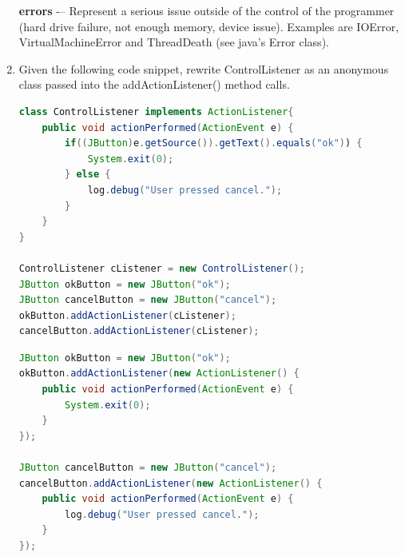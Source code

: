 \documentclass[11pt]{article}
\newenvironment{answer}{\large\lstset{basicstyle=\tiny\ttfamily}\color{white} }{}
\newenvironment{answer}{\large\lstset{basicstyle=\large\ttfamily}\color{red} }{}
\begin{document}
\begin{enumerate}
\begin{answer}
\textbf{errors} -– Represent a serious issue outside of the control of the programmer (hard drive
failure, not enough memory, device issue). Examples are IOError, VirtualMachineError and
ThreadDeath (see java's Error class).
\end{answer}



\item Given the following code snippet, rewrite ControlListener as an anonymous class passed into the addActionListener() method calls.  
\begin{lstlisting}[language=java]
class ControlListener implements ActionListener{
	public void actionPerformed(ActionEvent e) {
		if((JButton)e.getSource()).getText().equals("ok")) {
			System.exit(0);
		} else {
			log.debug("User pressed cancel.");
		}
	}
}

ControlListener cListener = new ControlListener();
JButton okButton = new JButton("ok");
JButton cancelButton = new JButton("cancel");
okButton.addActionListener(cListener);
cancelButton.addActionListener(cListener);
\end{lstlisting}
\begin{answer}
\begin{lstlisting}[language=java]
JButton okButton = new JButton("ok");
okButton.addActionListener(new ActionListener() {
	public void actionPerformed(ActionEvent e) {
		System.exit(0);
	}
});

JButton cancelButton = new JButton("cancel");
cancelButton.addActionListener(new ActionListener() {
	public void actionPerformed(ActionEvent e) {
		log.debug("User pressed cancel.");
	}
});
\end{lstlisting}
\end{answer}
\newpage


\end{enumerate}
\end{document}

